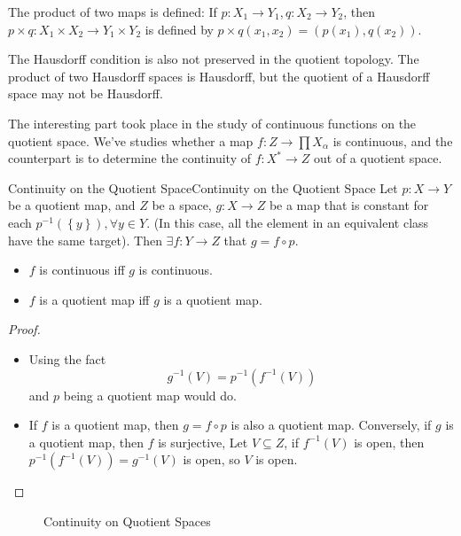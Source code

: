 \documentclass[../main.tex]{subfiles}
\begin{document}
The product of two maps is defined: If $p:X_1 \rightarrow Y_1,q:X_2 \rightarrow Y_2$, then $p \times q: X_1 \times X_2 \rightarrow Y_1 \times Y_2$ is defined by $p \times q (x_1,x_2) = (p(x_1),q(x_2))$.

The Hausdorff condition is also not preserved in the quotient topology. The product of two Hausdorff spaces is Hausdorff, but the quotient of a Hausdorff space may not be Hausdorff.

The interesting part took place in the study of continuous functions on the quotient space. We've studies whether a map $f: Z \rightarrow \prod X_{\alpha}$ is continuous, and the counterpart is to determine the continuity of $f: X^* \rightarrow Z$ out of a quotient space.

\begin{theorem}{Continuity on the Quotient Space}{Continuity on the Quotient Space}
Let $p:X \rightarrow Y$ be a quotient map, and $Z$ be a space, $g:X \rightarrow Z$ be a map that is constant for each $p^{-1}(\left\{ y \right\}),\forall y\in Y$. (In this case, all the element in an equivalent class have the same target). Then $\exists f: Y \rightarrow Z$ that $g = f\circ p$.
\begin{itemize}
\item $f$ is continuous iff $g$ is continuous.
\item $f$ is a quotient map iff $g$ is a quotient map.
\end{itemize}
\end{theorem}
\begin{proof}
\begin{itemize}
\item Using the fact
	\begin{equation*}
	g^{-1}(V) = p^{-1}(f^{-1}(V))
	\end{equation*}
	and $p$ being a quotient map would do.
\item If $f$ is a quotient map, then $g = f\circ p$ is also a quotient map. Conversely, if $g$ is a quotient map, then $f$ is surjective, Let $V \subseteq Z$, if $f^{-1}(V)$ is open, then $p^{-1}(f^{-1}(V)) = g^{-1}(V)$ is open, so $V$ is open.
\end{itemize}
\end{proof}

\begin{figure}[ht]
    \centering
    \caption{Continuity on Quotient Spaces}
    \label{fig:continuity-on-quotient-spaces}
\end{figure}
\end{document}
